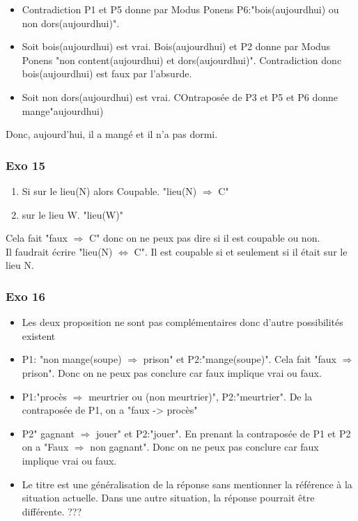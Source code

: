 \documentclass[]{book}
\theoremstyle{definition}
\begin{document}
\begin{itemize}
\item Contradiction P1 et P5 donne par Modus Ponens P6:"bois(aujourdhui) ou non dors(aujourdhui)". 
\item Soit bois(aujourdhui) est vrai. Bois(aujourdhui) et P2 donne par Modus Ponens "non content(aujourdhui) et dors(aujourdhui)". Contradiction donc bois(aujourdhui) est faux par l'absurde.
\item Soit non dors(aujourdhui) est vrai. COntrapos\'ee de P3 et P5 et P6 donne mange"aujourdhui)
\end{itemize}
Donc, aujourd'hui, il a mang\'e et il n'a pas dormi.

\subsubsection*{Exo 15}
\begin{enumerate}[P1:]
\item Si sur le lieu(N) alors Coupable. "lieu(N) $\Rightarrow$ C"
\item sur le lieu W. "lieu(W)"
\end{enumerate}

Cela fait "faux $\Rightarrow$ C" donc on ne peux pas dire si il est coupable ou non.\\
Il faudrait \'ecrire "lieu(N) $\Leftrightarrow$ C". Il est coupable si et seulement si il \'etait sur le lieu N.

\subsubsection*{Exo 16}
\begin{itemize}
\item Les deux proposition ne sont pas compl\'ementaires donc d'autre possibilit\'es existent
\item P1: "non mange(soupe) $\Rightarrow$ prison" et P2:"mange(soupe)". Cela fait "faux $\Rightarrow$ prison". Donc on ne peux pas conclure car faux implique vrai ou faux.
\item P1:"proc\`es $\Rightarrow$ meurtrier ou (non meurtrier)", P2:"meurtrier". De la contrapos\'ee de P1, on a "faux -> proc\`es"
\item P2" gagnant $\Rightarrow$ jouer" et P2:"jouer". En prenant la contrapos\'ee de P1 et P2 on a "Faux $\Rightarrow$ non gagnant". Donc on ne peux pas conclure car faux implique vrai ou faux.
\item Le titre est une g\'en\'eralisation de la r\'eponse sans mentionner la r\'ef\'erence \`a la situation actuelle. Dans une autre situation, la r\'eponse pourrait \^etre diff\'erente. ???
\end{itemize}
\end{document}
